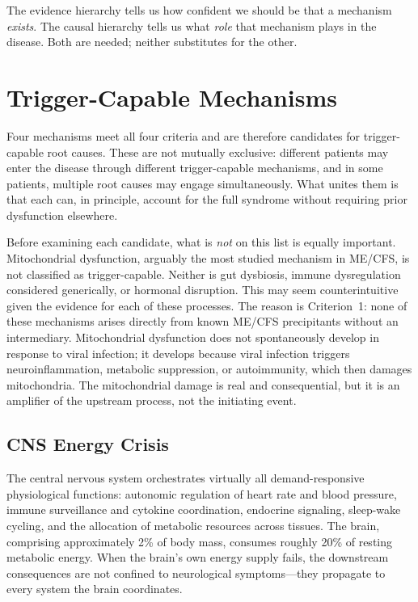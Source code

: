 The evidence hierarchy tells us how confident we should be that a mechanism \emph{exists}. The causal hierarchy tells us what \emph{role} that mechanism plays in the disease. Both are needed; neither substitutes for the other.



\section{Trigger-Capable Mechanisms}
\label{sec:trigger-capable}

Four mechanisms meet all four criteria and are therefore candidates for trigger-capable root causes. These are not mutually exclusive: different patients may enter the disease through different trigger-capable mechanisms, and in some patients, multiple root causes may engage simultaneously. What unites them is that each can, in principle, account for the full syndrome without requiring prior dysfunction elsewhere.

Before examining each candidate, what is \emph{not} on this list is equally important. Mitochondrial dysfunction, arguably the most studied mechanism in ME/CFS, is not classified as trigger-capable. Neither is gut dysbiosis, immune dysregulation considered generically, or hormonal disruption. This may seem counterintuitive given the evidence for each of these processes. The reason is Criterion~1: none of these mechanisms arises directly from known ME/CFS precipitants without an intermediary. Mitochondrial dysfunction does not spontaneously develop in response to viral infection; it develops because viral infection triggers neuroinflammation, metabolic suppression, or autoimmunity, which then damages mitochondria. The mitochondrial damage is real and consequential, but it is an amplifier of the upstream process, not the initiating event.


\subsection{CNS Energy Crisis}
\label{sec:root-cns-energy}

The central nervous system orchestrates virtually all demand-responsive physiological functions: autonomic regulation of heart rate and blood pressure, immune surveillance and cytokine coordination, endocrine signaling, sleep-wake cycling, and the allocation of metabolic resources across tissues. The brain, comprising approximately 2\% of body mass, consumes roughly 20\% of resting metabolic energy. When the brain's own energy supply fails, the downstream consequences are not confined to neurological symptoms---they propagate to every system the brain coordinates.

